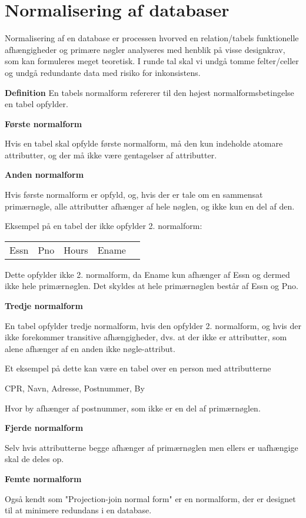 \section{Normalisering af databaser}


Normalisering af en database er processen hvorved en relation/tabels funktionelle afhængigheder og primære nøgler
analyseres med henblik på visse designkrav, som kan formuleres meget teoretisk. I runde tal skal vi undgå
tomme felter/celler og undgå redundante data med risiko for inkonsistens.


\textbf{Definition}
En tabels normalform refererer til den højest normalformsbetingelse en tabel opfylder.

\textbf{Første normalform}

Hvis en tabel skal opfylde første normalform, må den kun indeholde atomare attributter, og der må ikke være
gentagelser af attributter.

\textbf{Anden normalform}

Hvis første normalform er opfyld, og, hvis der er tale om en sammensat primærnøgle, alle attributter
afhænger af hele nøglen, og ikke kun en del af den.

Eksempel på en tabel der ikke opfylder 2. normalform:

\begin{tabular}{|c|c|c|c|c|}
	Essn & Pno & Hours & Ename
\end{tabular}

Dette opfylder ikke 2. normalform, da Ename kun afhænger af Essn og
dermed ikke hele \newline
primærnøglen. Det skyldes at hele primærnøglen består af Essn og Pno.

\textbf{Tredje normalform}

En tabel opfylder tredje normalform, hvis den opfylder 2. normalform,
og hvis der ikke forekommer transitive afhængigheder, dvs. at der ikke
er attributter, som alene afhænger af en anden ikke nøgle-attribut.

Et eksempel på dette kan være en tabel over en person med attributterne

\begin{center}
	CPR, Navn, Adresse, Postnummer, By
\end{center}

Hvor by afhænger af postnummer, som ikke er en del af primærnøglen.



\textbf{Fjerde normalform}

Selv hvis attributterne begge afhænger af primærnøglen men ellers er
uafhængige skal de deles op.


\textbf{Femte normalform}

Også kendt som "Projection-join normal form" er en normalform, der er
designet til at minimere redundans i en database.

